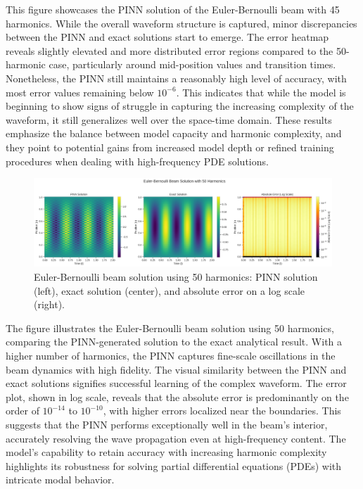 \documentclass[preprint,12pt]{elsarticle}
\begin{document}
This figure showcases the PINN solution of the Euler-Bernoulli beam with 45 harmonics. While the overall waveform structure is captured, minor discrepancies between the PINN and exact solutions start to emerge. The error heatmap reveals slightly elevated and more distributed error regions compared to the 50-harmonic case, particularly around mid-position values and transition times. Nonetheless, the PINN still maintains a reasonably high level of accuracy, with most error values remaining below \(10^{-6}\). This indicates that while the model is beginning to show signs of struggle in capturing the increasing complexity of the waveform, it still generalizes well over the space-time domain. These results emphasize the balance between model capacity and harmonic complexity, and they point to potential gains from increased model depth or refined training procedures when dealing with high-frequency PDE solutions.

\begin{figure}[t]
    \centering
    \includegraphics[width=0.9\linewidth]{figures/comparison_50h.png}
    \caption{Euler-Bernoulli beam solution using 50 harmonics: PINN solution (left), exact solution (center), and absolute error on a log scale (right).}
    \label{fig:comparison_50h}
\end{figure}

The figure illustrates the Euler-Bernoulli beam solution using 50 harmonics, comparing the PINN-generated solution to the exact analytical result. With a higher number of harmonics, the PINN captures fine-scale oscillations in the beam dynamics with high fidelity. The visual similarity between the PINN and exact solutions signifies successful learning of the complex waveform. The error plot, shown in log scale, reveals that the absolute error is predominantly on the order of \(10^{-14}\) to \(10^{-10}\), with higher errors localized near the boundaries. This suggests that the PINN performs exceptionally well in the beam’s interior, accurately resolving the wave propagation even at high-frequency content. The model's capability to retain accuracy with increasing harmonic complexity highlights its robustness for solving partial differential equations (PDEs) with intricate modal behavior.
\end{document}
